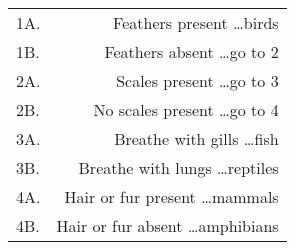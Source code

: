 \documentclass[12pt, varwidth, border=5mm]{standalone}
\begin{document}
\begin{tabular}{lr}
1A. & Feathers present \dots \dotfill birds \\
1B. & Feathers absent \dots \dotfill go to 2 \\
2A. & Scales present \dots \dotfill go to 3 \\
2B. & No scales present \dots \dotfill go to 4 \\
3A. & Breathe with gills \dots \dotfill fish \\
3B. & Breathe with lungs \dots \dotfill reptiles \\
4A. & Hair or fur present \dots \dotfill mammals \\
4B. & Hair or fur absent \dots \dotfill amphibians \\
\end{tabular}
\end{document}
